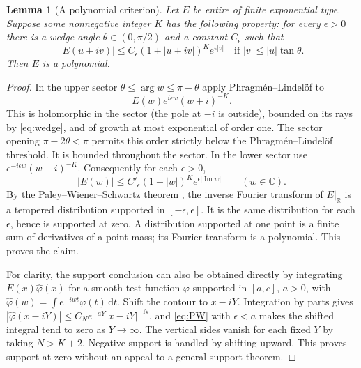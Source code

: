 \documentclass[11pt]{article}
\newtheorem{lemma}[theorem]{Lemma}
\theoremstyle{definition}\newtheorem{definition}[theorem]{Definition}
\theoremstyle{remark}\newtheorem{remark}[theorem]{Remark}
\newcommand{\R}{\mathbb R}\newcommand{\C}{\mathbb C}\newcommand{\dd}{\,\mathrm d}\newcommand{\ord}{\operatorname{ord}}\newcommand{\Rea}{\operatorname{Re}}\newcommand{\Ima}{\operatorname{Im}}\newcommand{\F}{\mathcal F}\newcommand{\G}{\mathcal G}\newcommand{\calL}{\mathcal L}
\begin{document}
\begin{lemma}[A polynomial criterion]\label{lem:poly}
Let $E$ be entire of finite exponential type. Suppose some nonnegative integer $K$ has the following property: for every $\epsilon>0$ there is a wedge angle $\theta\in(0,\pi/2)$ and a constant $C_\epsilon$ such that
\begin{equation}\label{eq:wedge}
 |E(u+iv)|\le C_\epsilon(1+|u+iv|)^K e^{\epsilon|v|}\quad\text{if }|v|\le |u|\tan\theta.
\end{equation}
Then $E$ is a polynomial.
\end{lemma}
\begin{proof}
In the upper sector $\theta\le\arg w\le\pi-\theta$ apply Phragm\'en--Lindel\"of to
\[
 E(w)e^{i\epsilon w}(w+i)^{-K}.
\]
This is holomorphic in the sector (the pole at $-i$ is outside), bounded on its rays by \eqref{eq:wedge}, and of growth at most exponential of order one. The sector opening $\pi-2\theta<\pi$ permits this order strictly below the Phragm\'en--Lindel\"of threshold. It is bounded throughout the sector. In the lower sector use $e^{-i\epsilon w}(w-i)^{-K}$. Consequently for each $\epsilon>0$,
\begin{equation}\label{eq:PW}
 |E(w)|\le C'_\epsilon(1+|w|)^K e^{\epsilon|\Ima w|}\qquad(w\in\C).
\end{equation}
By the Paley--Wiener--Schwartz theorem \cite[Thm.~7.3.1]{hormander}, the inverse Fourier transform of $E|_\R$ is a tempered distribution supported in $[-\epsilon,\epsilon]$. It is the same distribution for each $\epsilon$, hence is supported at zero. A distribution supported at one point is a finite sum of derivatives of a point mass; its Fourier transform is a polynomial. This proves the claim.

For clarity, the support conclusion can also be obtained directly by integrating $E(x)\widehat\varphi(x)$ for a smooth test function $\varphi$ supported in $[a,c]$, $a>0$, with $\widehat\varphi(w)=\int e^{-iwt}\varphi(t)\dd t$. Shift the contour to $x-iY$. Integration by parts gives $|\widehat\varphi(x-iY)|\le C_N e^{-aY}|x-iY|^{-N}$, and \eqref{eq:PW} with $\epsilon<a$ makes the shifted integral tend to zero as $Y\to\infty$. The vertical sides vanish for each fixed $Y$ by taking $N>K+2$. Negative support is handled by shifting upward. This proves support at zero without an appeal to a general support theorem.
\end{proof}
\end{document}

